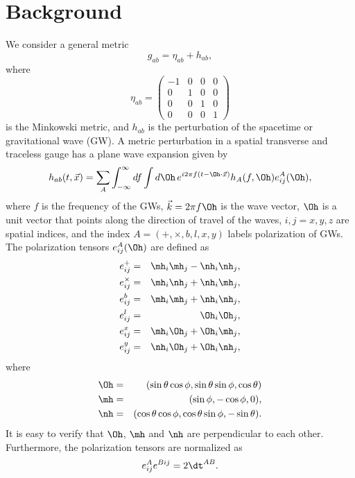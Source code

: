 \documentclass[
reprint,           %
superscriptaddress,%
amsmath,           %
amssymb,           %
aps,               %
prl,               %
notitlepage,       %
floatfix,          %
nofootinbib,
onecolumn
]{revtex4-1}
\def\e{\begin{equation}}
\def\q{\end{equation}}
\def\m{\begin{eqnarray}}
\def\n{\end{eqnarray}}
\begin{document}
\section{Background}
We consider a general metric
\e 
    g_{ab} = \eta_{ab} + h_{ab},
\q 
where 
\e 
    \eta_{ab} = \begin{pmatrix}
    -1 & 0 & 0 & 0\\
    0 & 1 & 0 &0\\
    0 & 0 & 1 &0\\
    0 & 0 & 0 & 1
\end{pmatrix}
\q
is the Minkowski metric, and $h_{ab}$
is the perturbation of the spacetime or gravitational wave (GW).
A metric perturbation in a spatial transverse and traceless gauge has a plane
wave expansion given by 
\e 
    h_{ab}(t, \vec{x}) = \sum_{A} \int_{-\infty}^{\infty} df \int d\Oh\, 
        e^{i2\pi f(t-\Oh\cdot\vec{x})} h_{A}(f, \Oh) e_{ij}^A(\Oh),
\q 
where $f$ is the frequency of the GWs, $\vec{k}=2\pi f \Oh$ is the wave vector,
$\Oh$ is a unit vector that points along the direction of travel of the waves,
$i,j=x, y, z$ are spatial indices, and the index $A=(+,\times,b,l,x,y)$ labels polarization
of GWs.
The polarization tensors $e^A_{ij}(\Oh)$ are defined as
\m 
  e^{+}_{ij} &=& \mh_i \mh_j - \nh_i \nh_j, \\
  e^{\times}_{ij} &=& \mh_i \nh_j + \nh_i \mh_j,\\
  e^{b}_{ij} &=& \mh_i \mh_j + \nh_i \nh_j, \\
  e^{l}_{ij} &=& \Oh_i \Oh_j, \\
  e^{x}_{ij} &=& \mh_i \Oh_j + \Oh_i \mh_j, \\
  e^{y}_{ij} &=& \nh_i \Oh_j + \Oh_i \nh_j,
\n
where
\m 
    \Oh &=& (\sin\theta \cos\phi, \sin\theta \sin\phi, \cos\theta)\\
    \mh &=& (\sin\phi, -\cos\phi, 0),\\
    \nh &=& (\cos\theta \cos\phi, \cos\theta \sin\phi, -\sin\theta).
\n 
It is easy to verify that $\Oh$, $\mh$ and $\nh$ are perpendicular to each other.
Furthermore, the polarization tensors are normalized as
\e 
    e^A_{ij} e^{Bij} = 2 \dt^{AB}.
\q 
\end{document}
